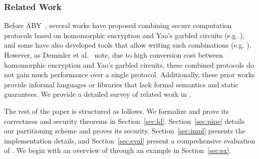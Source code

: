 \subsubsection*{Related Work}
Before ABY~\cite{aby}, several works have proposed
combining secure computation protocols based on homomorphic
encryption and Yao's garbled circuits
(e.g. \cite{barni,blanton,brickell,franz,huang,valeriaMatrix,valeriaRidge,schropferK11}),
and some have also developed tools that allow writing such
combinations (e.g. \cite{bogdanov,lone,tasty,autoS}). However, as Demmler et
al.~\cite{aby} note, due
 to high conversion cost between
homomorphic encryption and Yao's garbled circuits, these combined
protocols do not gain much performance over a single
protocol. 
Additionally, these prior works provide informal languages
or libraries that lack formal semantics and static guarantees.
 We provide a detailed survey of related
work in .

The rest of the paper is structured as follows. We formalize \tool and
prove its correctness and security theorems in
Section~\ref{sec:ld}. Section~\ref{sec:pipe} details our partitioning
scheme and proves its security. Section~\ref{sec:impl}
presents the implementation details, and
Section~\ref{sec:eval} present a comprehensive evaluation of \tool. We
begin with an overview of \tool through an example in
Section~\ref{sec:ex}. %





